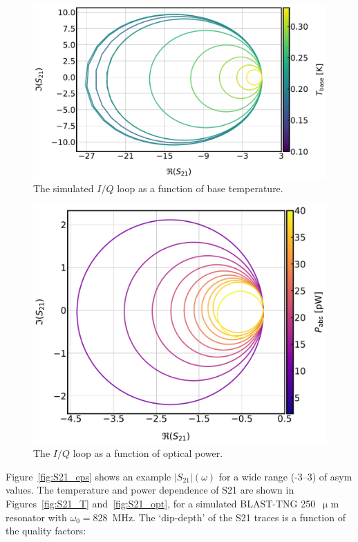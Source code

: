 \begin{figure}[!htbp]
  \centering
  \includegraphics[width=\textwidth]{figures/kid_model/IQloop_T250}
  \caption[The simulated  loop as a function of base temperature.]{The simulated $I/Q$ loop as a function of base temperature.}
  \label{fig:IQloop_T}
\end{figure}

\begin{figure}[!htbp]
  \centering
  \includegraphics[width=\textwidth]{figures/kid_model/IQloop_opt250}
  \caption[The simulated  loop as a function of optical power.]{The $I/Q$ loop as a function of optical power.}
\label{fig:IQloop_P}
\end{figure}

Figure~\ref{fig:S21_eps} shows an example $\left| S_{21} \right|(\omega)$ for a wide range (-3--3) of \gls{asym} values. The temperature and power dependence of \gls{S21} are shown in Figures~\ref{fig:S21_T} and~\ref{fig:S21_opt}, for a simulated BLAST-TNG 250~$\upmu$m resonator with $\omega_{0} = 828$~MHz. The `dip-depth' of the \gls{S21} traces is a function of the quality factors:

